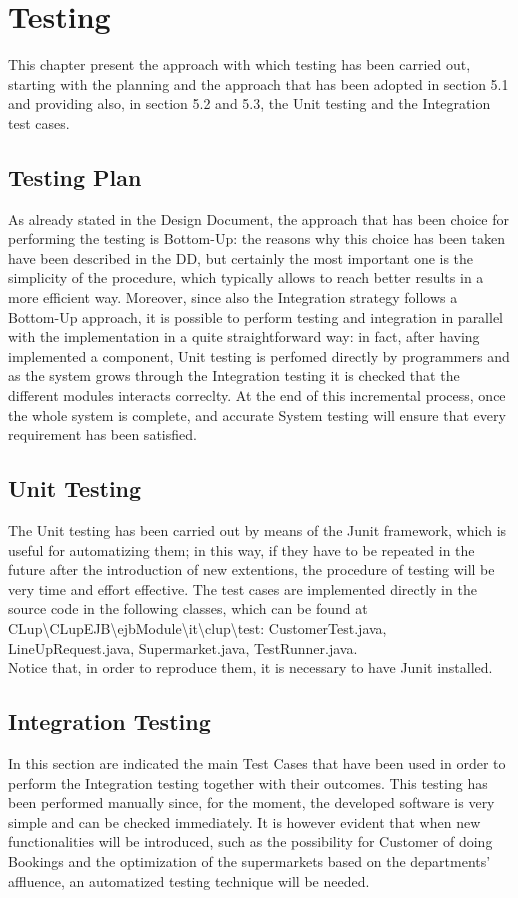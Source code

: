 \chapter{Testing}

This chapter present the approach with which testing has been carried out, starting with the planning and the approach that has been adopted in section 5.1 and providing also, in section 5.2 and 5.3, the Unit testing  and the Integration test cases.
 

\section{Testing Plan}
As already stated in the Design Document, the approach that has been choice for performing the testing is Bottom-Up: the reasons why this choice has been taken have been described in the DD, but certainly the most important one is the simplicity of the procedure, which typically allows to reach better results in a more efficient way. Moreover, since also the Integration strategy follows a Bottom-Up approach, it is possible to perform testing and integration in parallel with the implementation in a quite straightforward way: in fact, after having implemented a component, Unit testing is perfomed directly by programmers and as the system grows through the Integration testing it is checked that the different modules interacts correclty. At the end of this incremental process, once the whole system is complete, and accurate System testing will ensure that every requirement has been satisfied.

\section{Unit Testing}
The Unit testing has been carried out by means of the Junit framework, which is useful for automatizing them; in this way, if they have to be repeated in the future after the introduction of new extentions, the procedure of testing will be very time and effort effective. The test cases are implemented directly in the source code in the following classes, which can be found at CLup\textbackslash CLupEJB\textbackslash ejbModule\textbackslash it\textbackslash clup\textbackslash test: CustomerTest.java, LineUpRequest.java, Supermarket.java, TestRunner.java. \\
 Notice that, in order to reproduce them, it is necessary to have Junit installed.

\section{Integration Testing}
In this section are indicated the main Test Cases that have been used in order to perform the Integration testing together with their outcomes. This testing has been performed manually since, for the moment, the developed software is very simple and can be checked immediately. It is however evident that when new functionalities will be introduced, such as the possibility for Customer of doing Bookings and the optimization of the supermarkets based on the departments' affluence, an automatized testing technique will be needed.



